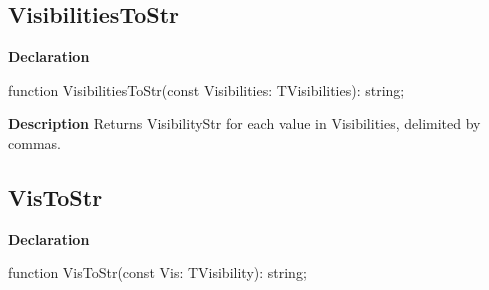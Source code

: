 \documentclass{report}
\newif\ifpdf
\begin{document}
\subsection*{VisibilitiesToStr}
\fi
\label{PasDoc_Items-VisibilitiesToStr}
\begin{list}{}{
\setlength{\itemindent}{0cm}
\setlength{\listparindent}{0cm}
\setlength{\leftmargin}{\evensidemargin}
\addtolength{\leftmargin}{\tmplength}
\settowidth{\labelsep}{X}
\addtolength{\leftmargin}{\labelsep}
\setlength{\labelwidth}{\tmplength}
}
\item[\textbf{Declaration}\hfill]
\ifpdf
\begin{flushleft}
\fi
\begin{ttfamily}
function VisibilitiesToStr(const Visibilities: TVisibilities): string;\end{ttfamily}

\ifpdf
\end{flushleft}
\fi

\par
\item[\textbf{Description}]
Returns VisibilityStr for each value in Visibilities, delimited by commas.

\end{list}
\ifpdf
\subsection*{\large{\textbf{VisToStr}}\normalsize\hspace{1ex}\hrulefill}
\else
\subsection*{VisToStr}
\fi
\label{PasDoc_Items-VisToStr}
\begin{list}{}{
\setlength{\itemindent}{0cm}
\setlength{\listparindent}{0cm}
\setlength{\leftmargin}{\evensidemargin}
\addtolength{\leftmargin}{\tmplength}
\settowidth{\labelsep}{X}
\addtolength{\leftmargin}{\labelsep}
\setlength{\labelwidth}{\tmplength}
}
\item[\textbf{Declaration}\hfill]
\ifpdf
\begin{flushleft}
\fi
\begin{ttfamily}
function VisToStr(const Vis: TVisibility): string;\end{ttfamily}

\ifpdf
\end{flushleft}
\fi

\end{list}
\end{document}
